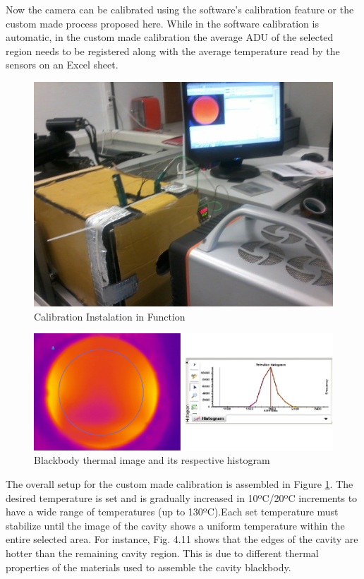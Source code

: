 \par Now the camera can be calibrated using the software’s calibration feature or the custom made process proposed here. While in the software calibration is automatic, in the custom made calibration the average ADU of the selected region needs to be registered along with the average temperature read by the sensors on an Excel sheet. \\

\begin{figure}[h]
\centering
\includegraphics[width=0.55\linewidth]{Figures/4.Chapter/calibinprog.jpg}
\caption{Calibration Instalation in Function}
\label{fig:calibinprog}
\end{figure}

\begin{figure}[h]
\centering
\includegraphics[width=1\linewidth]{Figures/4.Chapter/ex11.png}
\caption{Blackbody thermal image and its respective histogram}
\label{fig:ex1}
\end{figure}

\par The overall setup for the custom made calibration is assembled in Figure \ref{fig:calibinprog}. The desired temperature is set and is gradually increased in 10ºC/20ºC increments to have a wide range of temperatures (up to 130ºC).Each set temperature must stabilize until the image of the cavity shows a uniform temperature within the entire selected area. For instance, Fig. 4.11 shows that the edges of the cavity are hotter than the remaining cavity region. This is due to different thermal properties of the materials used to assemble the cavity blackbody.\\

